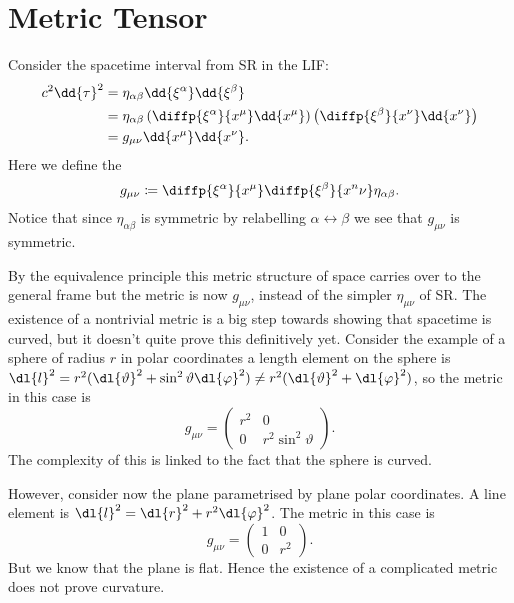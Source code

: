 \documentclass[fleqn]{NotesClass}
\begin{document}
    \section{Metric Tensor}
    Consider the spacetime interval from SR in the LIF:
    \begin{align}
        c^2\dd{\tau}^2 &= \eta_{\alpha\beta}\dd{\xi^\alpha}\dd{\xi^\beta}\\
        &= \eta_{\alpha\beta}\left( \diffp{\xi^\alpha}{x^\mu}\dd{x^\mu} \right)\left( \diffp{\xi^\beta}{x^\nu}\dd{x^\nu} \right)\\
        &= g_{\mu\nu}\dd{x^\mu}\dd{x^\nu}.
    \end{align}
    Here we define the 
    \begin{equation}
        g_{\mu\nu} \coloneqq \diffp{\xi^\alpha}{x^\mu}\diffp{\xi^\beta}{x^n\nu}\eta_{\alpha\beta}.
    \end{equation}
    Notice that since \(\eta_{\alpha\beta}\) is symmetric by relabelling \(\alpha \leftrightarrow \beta\) we see that \(g_{\mu\nu}\) is symmetric.
    
    By the equivalence principle this metric structure of space carries over to the general frame but the metric is now \(g_{\mu\nu}\), instead of the simpler \(\eta_{\mu\nu}\) of SR.
    The existence of a nontrivial metric is a big step towards showing that spacetime is curved, but it doesn't quite prove this definitively yet.
    Consider the example of a sphere of radius \(r\) in polar coordinates a length element on the sphere is \(\dl{l}^2 = r^2(\dl{\vartheta}^2 + \sin^2\vartheta\dl{\varphi}^2) \ne r^2(\dl{\vartheta}^2 + \dl{\varphi}^2)\), so the metric in this case is
    \begin{equation}
        g_{\mu\nu} = 
        \begin{pmatrix}
            r^2 & 0\\
            0 & r^2\sin^2\vartheta
        \end{pmatrix}
        .
    \end{equation}
    The complexity of this is linked to the fact that the sphere is curved.
    
    However, consider now the plane parametrised by plane polar coordinates.
    A line element is \(\dl{l}^2 = \dl{r}^2 + r^2\dl{\varphi}^2\).
    The metric in this case is
    \begin{equation}
        g_{\mu\nu} = 
        \begin{pmatrix}
            1 & 0\\
            0 & r^2
        \end{pmatrix}
        .
    \end{equation}
    But we know that the plane is flat.
    Hence the existence of a complicated metric does not prove curvature.
    
\end{document}
